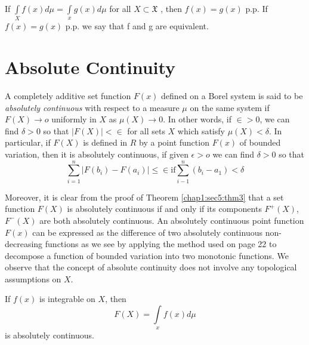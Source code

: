 \begin{corollary}\label{chap1:sec11:coro2} 
  If $\int\limits_{X} f(x)d \mu = \int\limits_{x} g(x)d\mu$ for all
  $X\subset \mathfrak{X}$ , then $f(x) = g(x)$ p.p. If $f(x) = g(x)$ p.p. we
  say that f and g are equivalent. 
\end{corollary}

\section{Absolute Continuity}\label{chap1:sec12} 
				
A completely additive set function $F(x)$ defined on a Borel system is
said to be \textit{absolutely continuous} with respect to a measure
$\mu$ on the same
system if $F(X)\rightarrow o$ uniformly in $X$ as
$\mu(X)\rightarrow 0$. In other words, if $\in > 0$, we can find
$\delta > 0$ so that $|F(X)| < \in$ for all sets $X$ which satisfy
$\mu(X)< \delta$. In particular, if $F(X)$ is defined in $R$ by a point
function $F(x)$ of bounded variation, then it is absolutely continuous,
if given $\epsilon > o $ we can find $\delta > 0 $ so that  
$$
\sum_{i=1}^n\Big| F(b_i)- F(a_i) \Big| \leq \in
\text{if}  \sum_{i-1}^n (b_i-a_1) < \delta
$$\pageoriginale
					
Moreover, it is clear from the proof of Theorem \ref{chap1:sec5:thm3} that a set function
$F(X)$ is absolutely continuous if and only if its components
$F^{+}(X)$, $F^{-}(X)$ are both absolutely continuous. An absolutely
continuous point function $F(x)$ can be expressed as the difference of
two absolutely continuous non-decreasing functions as we see by
applying the method used on page 22 to decompose a function of bounded
variation into two monotonic functions. We observe that the concept of
absolute continuity does not involve any topological assumptions on
$X$. 

\begin{theorem}\label{chap1:sec12:thm25} 
  If $f(x)$ is integrable on $X$, then 
  $$
  F(X) = \int \limits_{x} f(x)d \mu
  $$
  is absolutely continuous.
\end{theorem}

